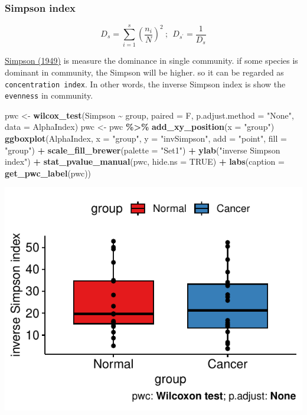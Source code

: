 \documentclass[
]{article}
\newenvironment{Shaded}{\begin{snugshade}}{\end{snugshade}}
\newcommand{\AttributeTok}[1]{\textcolor[rgb]{0.13,0.29,0.53}{#1}}
\newcommand{\ConstantTok}[1]{\textcolor[rgb]{0.56,0.35,0.01}{#1}}
\newcommand{\FunctionTok}[1]{\textcolor[rgb]{0.13,0.29,0.53}{\textbf{#1}}}
\newcommand{\NormalTok}[1]{#1}
\newcommand{\OtherTok}[1]{\textcolor[rgb]{0.56,0.35,0.01}{#1}}
\newcommand{\SpecialCharTok}[1]{\textcolor[rgb]{0.81,0.36,0.00}{\textbf{#1}}}
\newcommand{\StringTok}[1]{\textcolor[rgb]{0.31,0.60,0.02}{#1}}
\begin{document}
\hypertarget{simpson-index}{%
\subsubsection{Simpson index}\label{simpson-index}}

\[ D_s = \sum_{i = 1}^{s} (\frac{n_i}{N})^2  \ ;\ \  D_{s^\prime    }  =  \frac{1}{D_s} \]

\href{https://www.nature.com/articles/163688a0}{Simpson (1949)} is
measure the dominance in single community. if some species is dominant
in community, the Simpson will be higher. so it can be regarded as
\texttt{concentration\ index}. In other words, the inverse Simpson index
is show the \texttt{evenness} in community.

\begin{Shaded}
\begin{Highlighting}[]
\NormalTok{pwc }\OtherTok{\textless{}{-}} \FunctionTok{wilcox\_test}\NormalTok{(Simpson }\SpecialCharTok{\textasciitilde{}}\NormalTok{ group, }\AttributeTok{paired =}\NormalTok{ F, }\AttributeTok{p.adjust.method =} \StringTok{"None"}\NormalTok{, }\AttributeTok{data =}\NormalTok{ AlphaIndex)}
\NormalTok{pwc }\OtherTok{\textless{}{-}}\NormalTok{ pwc }\SpecialCharTok{\%\textgreater{}\%} \FunctionTok{add\_xy\_position}\NormalTok{(}\AttributeTok{x =} \StringTok{"group"}\NormalTok{)}
\FunctionTok{ggboxplot}\NormalTok{(AlphaIndex, }\AttributeTok{x =} \StringTok{"group"}\NormalTok{, }\AttributeTok{y =} \StringTok{"invSimpson"}\NormalTok{, }\AttributeTok{add =} \StringTok{"point"}\NormalTok{, }\AttributeTok{fill =} \StringTok{"group"}\NormalTok{) }\SpecialCharTok{+}
  \FunctionTok{scale\_fill\_brewer}\NormalTok{(}\AttributeTok{palette =} \StringTok{"Set1"}\NormalTok{) }\SpecialCharTok{+} \FunctionTok{ylab}\NormalTok{(}\StringTok{"inverse Simpson index"}\NormalTok{) }\SpecialCharTok{+}
  \FunctionTok{stat\_pvalue\_manual}\NormalTok{(pwc, }\AttributeTok{hide.ns =} \ConstantTok{TRUE}\NormalTok{) }\SpecialCharTok{+}
  \FunctionTok{labs}\NormalTok{(}\AttributeTok{caption =} \FunctionTok{get\_pwc\_label}\NormalTok{(pwc))}
\end{Highlighting}
\end{Shaded}

\includegraphics[width=0.7\linewidth,height=0.7\textheight]{workshop_files/figure-latex/unnamed-chunk-18-1}
\end{document}
